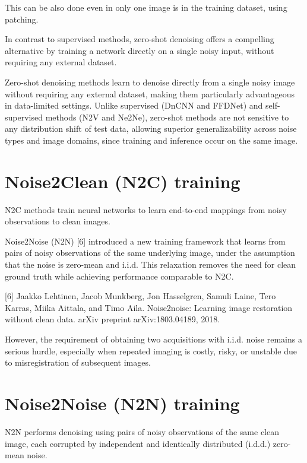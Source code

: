 This can be also done even in only one image is in the training dataset, using patching.

In contrast to supervised methods, zero-shot denoising offers a
compelling alternative by training a network directly on a single
noisy input, without requiring any external dataset. %

Zero-shot denoising methods learn to denoise directly from a single
noisy image without requiring any external dataset, making them
particularly advantageous in data-limited settings. Unlike supervised (DnCNN and FFDNet)
and self-supervised methods (N2V and Ne2Ne), zero-shot methods are not sensitive to
any distribution shift of test data, allowing superior
generalizability across noise types and image domains, since training
and inference occur on the same image.

\section{Noise2Clean (N2C) training}
N2C methods train neural networks to learn end-to-end mappings
from noisy observations to clean images. %

Noise2Noise (N2N) [6] introduced a new training framework that learns
from pairs of noisy observations of the same underlying image, under
the assumption that the noise is zero-mean and i.i.d. This relaxation
removes the need for clean ground truth while achieving performance
comparable to N2C. %

[6] Jaakko Lehtinen, Jacob Munkberg, Jon Hasselgren, Samuli Laine, Tero Karras, Miika Aittala, and Timo Aila.
Noise2noise: Learning image restoration without clean data. arXiv preprint arXiv:1803.04189, 2018.

However, the requirement of obtaining two acquisitions with
i.i.d. noise remains a serious hurdle, especially when repeated
imaging is costly, risky, or unstable due to misregistration of
subsequent images. %

\section{Noise2Noise (N2N) training}
N2N performs denoising using pairs of noisy observations of the same
clean image, each corrupted by independent and identically distributed
(i.d.d.) zero-mean noise. %

